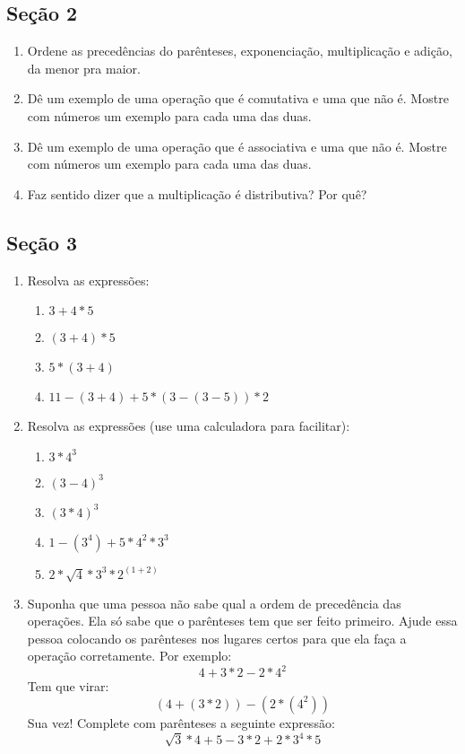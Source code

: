 \documentclass{article}
\begin{document}
\subsection{Seção 2}
\begin{enumerate}
\item Ordene as precedências do parênteses, exponenciação, multiplicação e 
adição, da menor pra maior.
\item Dê um exemplo de uma operação que é comutativa e uma que não é. Mostre
com números um exemplo para cada uma das duas.
\item Dê um exemplo de uma operação que é associativa e uma que não é. Mostre
com números um exemplo para cada uma das duas.
\item Faz sentido dizer que a multiplicação é distributiva? Por quê?
\end{enumerate}

\subsection{Seção 3}
\begin{enumerate}
\item Resolva as expressões:
\begin{enumerate}
\item $3 + 4*5$
\item $(3 + 4)*5$
\item $5*(3 + 4)$
\item $11 - (3 + 4) + 5*(3 - (3 - 5))*2$
\end{enumerate}
\item Resolva as expressões (use uma calculadora para facilitar):
\begin{enumerate}
\item $3 * 4^3$
\item ${(3 - 4)}^3$
\item ${(3 * 4)}^3$
\item $1 - (3^4) + 5*4^2*3^3$
\item $2*\sqrt{4}*3^3*2^{(1+2)}$
\end{enumerate}
\item Suponha que uma pessoa não sabe qual a ordem de precedência das
operações. Ela só sabe que o parênteses tem que ser feito primeiro.
Ajude essa pessoa colocando os parênteses nos lugares certos para que ela
faça a operação corretamente. Por exemplo:
$$4 + 3*2 - 2*4^2$$
Tem que virar:
$$(4 + (3*2)) - (2*(4^2))$$
Sua vez! Complete com parênteses a seguinte expressão:
$$\sqrt{3}*4 + 5 - 3*2 + 2*3^4*5$$

\end{enumerate}
\end{document}

